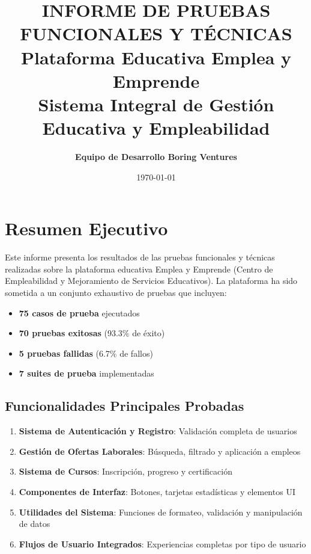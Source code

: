 \documentclass[12pt,a4paper]{article}
\title{
    \vspace{2cm}
    {\huge \textbf{INFORME DE PRUEBAS FUNCIONALES Y TÉCNICAS}}\\[0.5cm]
    {\Large Plataforma Educativa Emplea y Emprende}\\[0.3cm]
    {\large Sistema Integral de Gestión Educativa y Empleabilidad}
}
\author{
    \textbf{Equipo de Desarrollo Boring Ventures}\\
}
\date{\today}
\begin{document}
\maketitle
\thispagestyle{empty}
\newpage

\tableofcontents
\newpage

\section{Resumen Ejecutivo}

Este informe presenta los resultados de las pruebas funcionales y técnicas realizadas sobre la plataforma educativa Emplea y Emprende (Centro de Empleabilidad y Mejoramiento de Servicios Educativos). La plataforma ha sido sometida a un conjunto exhaustivo de pruebas que incluyen:

\begin{itemize}
    \item \textcolor{primaryblue}{\textbf{75 casos de prueba}} ejecutados
    \item \textcolor{successgreen}{\textbf{70 pruebas exitosas}} (93.3\% de éxito)
    \item \textcolor{dangerred}{\textbf{5 pruebas fallidas}} (6.7\% de fallos)
    \item \textcolor{primaryblue}{\textbf{7 suites de prueba}} implementadas
\end{itemize}

\subsection{Funcionalidades Principales Probadas}
\begin{enumerate}
    \item \textbf{Sistema de Autenticación y Registro}: Validación completa de usuarios
    \item \textbf{Gestión de Ofertas Laborales}: Búsqueda, filtrado y aplicación a empleos
    \item \textbf{Sistema de Cursos}: Inscripción, progreso y certificación
    \item \textbf{Componentes de Interfaz}: Botones, tarjetas estadísticas y elementos UI
    \item \textbf{Utilidades del Sistema}: Funciones de formateo, validación y manipulación de datos
    \item \textbf{Flujos de Usuario Integrados}: Experiencias completas por tipo de usuario
\end{enumerate}
\end{document}
